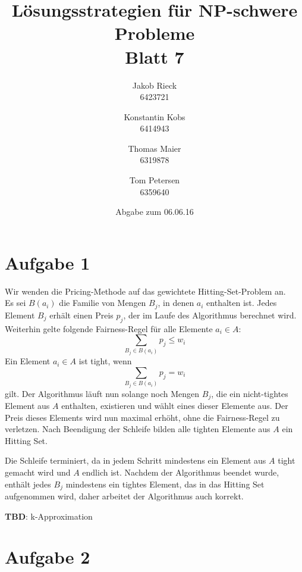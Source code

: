 \documentclass[12pt,a4paper]{article}
\title{Lösungsstrategien für NP-schwere Probleme\\Blatt 7}
\author{
		Jakob Rieck\\
		\small{6423721}
	\and
		Konstantin Kobs\\
		\small{6414943}
	\and
		Thomas Maier\\
		\small{6319878}
	\and
		Tom Petersen\\
		\small{6359640}
}
\date{Abgabe zum 06.06.16}
\begin{document}
\maketitle

\section*{Aufgabe 1}

Wir wenden die Pricing-Methode auf das gewichtete Hitting-Set-Problem an.\\
Es sei \(B(a_i)\) die Familie von Mengen \(B_j\), in denen \(a_i\) enthalten ist. Jedes Element \(B_j\) erhält einen Preis \(p_j\), der im Laufe des Algorithmus berechnet wird. Weiterhin gelte folgende Fairness-Regel für alle Elemente \(a_i \in A\): 
\[\sum_{B_j \in B(a_i)} p_j \le w_i\]
Ein Element \(a_i \in A\) ist tight, wenn \[\sum_{B_j \in B(a_i)} p_j = w_i\] gilt. Der Algorithmus läuft nun solange noch Mengen \(B_j\), die ein nicht-tightes Element aus \(A\) enthalten, existieren und wählt eines dieser Elemente aus. Der Preis dieses Elements wird nun maximal erhöht, ohne die Fairness-Regel zu verletzen. Nach Beendigung der Schleife bilden alle tighten Elemente aus \(A\) ein Hitting Set.

Die Schleife terminiert, da in jedem Schritt mindestens ein Element aus \(A\) tight gemacht wird und \(A\) endlich ist. Nachdem der Algorithmus beendet wurde, enthält jedes \(B_j\) mindestens ein tightes Element, das in das Hitting Set aufgenommen wird, daher arbeitet der Algorithmus auch korrekt.

\textbf{TBD}: k-Approximation

\section*{Aufgabe 2}
\end{document}

